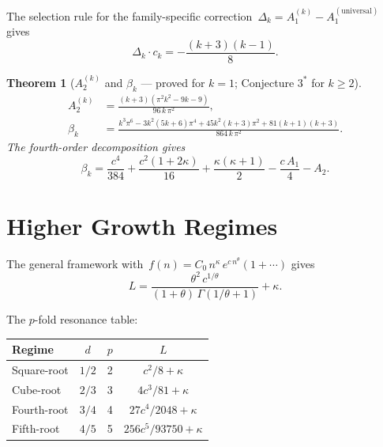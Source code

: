 \documentclass[11pt,a4paper]{article}
\newtheorem{theorem}{Theorem}[section]
\begin{document}
The selection rule for the family-specific correction~$\Delta_k = A_1^{(k)} - A_1^{(\mathrm{universal})}$ gives
\begin{equation}\label{eq:delta_k}
  \Delta_k \cdot c_k = -\frac{(k+3)(k-1)}{8}.
\end{equation}

\begin{theorem}[$A_2^{(k)}$ and $\beta_k$ --- proved for $k=1$; Conjecture $3^*$ for $k \geq 2$]\label{thm:A2k}
\begin{align}
  A_2^{(k)} &= \frac{(k+3)(\pi^2 k^2 - 9k - 9)}{96\,k\,\pi^2}, \label{eq:A2k}\\[4pt]
  \beta_k &= \frac{k^3\pi^6 - 3k^2(5k+6)\pi^4 + 45k^2(k+3)\pi^2 + 81(k+1)(k+3)}{864\,k\,\pi^2}. \label{eq:betak}
\end{align}
The fourth-order decomposition gives
\begin{equation}\label{eq:beta_decomp}
  \beta_k = \frac{c^4}{384} + \frac{c^2(1+2\kappa)}{16} + \frac{\kappa(\kappa+1)}{2} - \frac{c\,A_1}{4} - A_2.
\end{equation}
\end{theorem}

\section{Higher Growth Regimes}\label{sec:higher_growth}

The general framework with~$f(n) = C_0\,n^{\kappa}\,e^{c\,n^{\theta}}(1 + \cdots)$ gives
\begin{equation}\label{eq:general_L}
  L = \frac{\theta^2\,c^{1/\theta}}{(1+\theta)\,\Gamma(1/\theta + 1)} + \kappa.
\end{equation}

The $p$-fold resonance table:
\begin{center}
\begin{tabular}{@{}lccc@{}}
\toprule
Regime & $d$ & $p$ & $L$ \\
\midrule
Square-root   & $1/2$ & 2 & $c^2/8 + \kappa$ \\
Cube-root     & $2/3$ & 3 & $4c^3/81 + \kappa$ \\
Fourth-root   & $3/4$ & 4 & $27c^4/2048 + \kappa$ \\
Fifth-root    & $4/5$ & 5 & $256c^5/93750 + \kappa$ \\
\bottomrule
\end{tabular}
\end{center}
\end{document}
